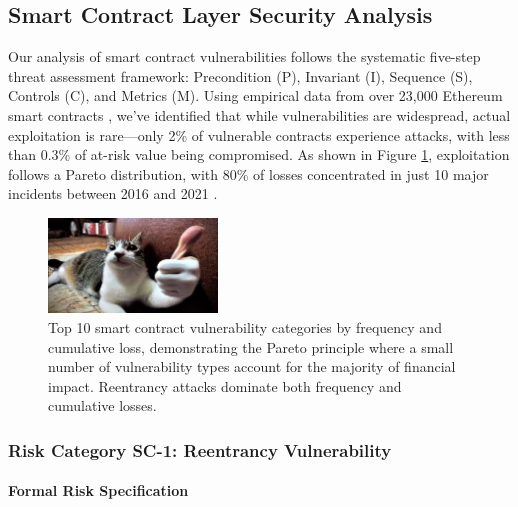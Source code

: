 \subsection{Smart Contract Layer Security Analysis}
\label{sec:results_smart_contract}

Our analysis of smart contract vulnerabilities follows the systematic five-step threat assessment framework: Precondition (P), Invariant (I), Sequence (S), Controls (C), and Metrics (M). Using empirical data from over 23,000 Ethereum smart contracts \cite{perez2021analysis}, we've identified that while vulnerabilities are widespread, actual exploitation is rare—only 2\% of vulnerable contracts experience attacks, with less than 0.3\% of at-risk value being compromised. As shown in Figure \ref{fig:smart_contract_pareto}, exploitation follows a Pareto distribution, with 80\% of losses concentrated in just 10 major incidents between 2016 and 2021 \cite{zhou2023sok}.

\begin{figure}[H]
\centering
\includegraphics[width=0.4\textwidth]{../figure/fig2.png}
\caption{Top 10 smart contract vulnerability categories by frequency and cumulative loss, demonstrating the Pareto principle where a small number of vulnerability types account for the majority of financial impact. Reentrancy attacks dominate both frequency and cumulative losses.}
\label{fig:smart_contract_pareto}
\end{figure}

\subsubsection{Risk Category SC-1: Reentrancy Vulnerability}

\paragraph{Formal Risk Specification}

